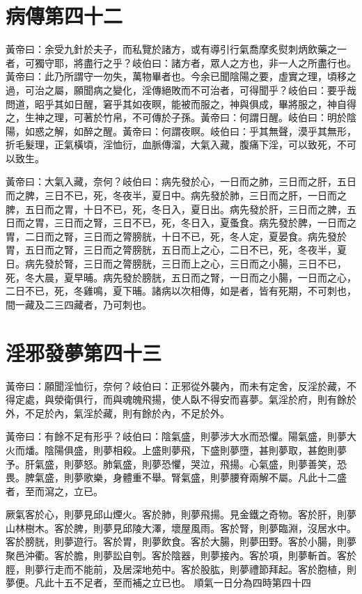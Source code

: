 \section{病傳第四十二}

黃帝曰：余受九針於夫子，而私覽於諸方，或有導引行氣喬摩炙熨刺炳飲藥之一者，可獨守耶，將盡行之乎？岐伯曰：諸方者，眾人之方也，非一人之所盡行也。黃帝曰：此乃所謂守一勿失，萬物畢者也。今余已聞陰陽之要，虛實之理，頃移之過，可治之屬，願聞病之變化，淫傳絕敗而不可治者，可得聞乎？岐伯曰：要乎哉問道，昭乎其如日醒，窘乎其如夜瞑，能被而服之，神與俱成，畢將服之，神自得之，生神之理，可著於竹帛，不可傳於子孫。黃帝曰：何謂日醒。岐伯曰：明於陰陽，如惑之解，如醉之醒。黃帝曰：何謂夜瞑。岐伯曰：乎其無聲，漠乎其無形，折毛髮理，正氣橫頃，淫恤衍，血脈傳溜，大氣入藏，腹痛下淫，可以致死，不可以致生。

黃帝曰：大氣入藏，奈何？岐伯曰：病先發於心，一日而之肺，三日而之肝，五日而之脾，三日不已，死，冬夜半，夏日中。病先發於肺，三日而之肝，一日而之脾，五日而之胃，十日不已，死，冬日入，夏日出。病先發於肝，三日而之脾，五日而之胃，三日而之腎，三日不已，死，冬日入，夏蚤食。病先發於脾，一日而之胃，二日而之腎，三日而之膂膀胱，十日不已，死，冬人定，夏晏食。病先發於胃，五日而之腎，三日而之膂膀胱，五日而上之心，二日不已，死，冬夜半，夏日。病先發於腎，三日而之膂膀胱，三日而上之心，三日而之小腸，三日不已，死，冬大晨，夏早晡。病先發於膀胱，五日而之腎，一日而之小腸，一日而之心，二日不已，死，冬雞鳴，夏下晡。諸病以次相傳，如是者，皆有死期，不可刺也，間一藏及二三四藏者，乃可刺也。



\section{淫邪發夢第四十三}

黃帝曰：願聞淫恤衍，奈何？岐伯曰：正邪從外襲內，而未有定舍，反淫於藏，不得定處，與滎衛俱行，而與魂魄飛揚，使人臥不得安而喜夢。氣淫於府，則有餘於外，不足於內，氣淫於藏，則有餘於內，不足於外。

黃帝曰：有餘不足有形乎？岐伯曰：陰氣盛，則夢涉大水而恐懼。陽氣盛，則夢大火而燔。陰陽俱盛，則夢相殺。上盛則夢飛，下盛則夢墮，甚則夢取，甚飽則夢予。肝氣盛，則夢怒。肺氣盛，則夢恐懼，哭泣，飛揚。心氣盛，則夢善笑，恐畏。脾氣盛，則夢歌樂，身體重不舉。腎氣盛，則夢腰脊兩解不屬。凡此十二盛者，至而瀉之，立已。

厥氣客於心，則夢見邱山煙火。客於肺，則夢飛揚。見金鐵之奇物。客於肝，則夢山林樹木。客於脾，則夢見邱陵大澤，壞屋風雨。客於腎，則夢臨淵，沒居水中。客於膀胱，則夢遊行。客於胃，則夢飲食。客於大腸，則夢田野。客於小腸，則夢聚邑沖衢。客於膽，則夢訟自刳。客於陰器，則夢接內。客於項，則夢斬首。客於脛，則夢行走而不能前，及居深地苑中。客於股肱，則夢禮節拜起。客於胞植，則夢便。凡此十五不足者，至而補之立已也。
順氣一日分為四時第四十四

